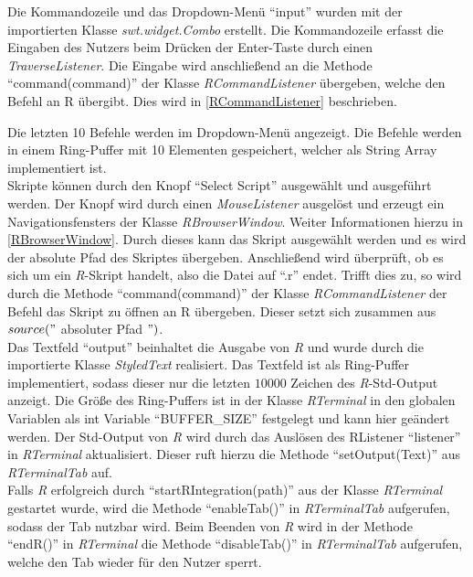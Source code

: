 \documentclass[a4paper, 12pt]{report} %
\begin{document}
Die Kommandozeile und das Dropdown-Menü "`input"' wurden mit der importierten Klasse \textit{swt.widget.Combo} erstellt. Die Kommandozeile erfasst die Eingaben des Nutzers beim Drücken der Enter-Taste durch einen \textit{TraverseListener}. Die Eingabe wird anschließend an die Methode "`command(command)"' der Klasse  \textit{RCommandListener} übergeben, welche den Befehl an R übergibt. Dies wird in \ref{RCommandListener} beschrieben.

Die letzten 10 Befehle werden im Dropdown-Menü angezeigt. Die Befehle werden in einem Ring-Puffer mit 10 Elementen gespeichert, welcher als String Array implementiert ist.\\

Skripte können durch den Knopf "`Select Script"' ausgewählt und ausgeführt werden. Der Knopf wird durch einen \textit{MouseListener} ausgelöst und erzeugt ein Navigationsfensters der Klasse \textit{RBrowserWindow}. Weiter Informationen hierzu in \ref{RBrowserWindow}. Durch dieses kann das Skript ausgewählt werden und es wird der absolute Pfad des Skriptes übergeben. Anschließend wird überprüft, ob es sich um ein \textit{R}-Skript handelt, also die Datei auf "`.r"' endet. Trifft dies zu, so wird durch die Methode "`command(command)"' der Klasse  \textit{RCommandListener} der Befehl das Skript zu öffnen an R übergeben. Dieser setzt sich zusammen aus $source("$  absoluter Pfad $")$. \\

Das Textfeld "`output"' beinhaltet die Ausgabe von \textit{R} und wurde durch die importierte Klasse \textit{StyledText} realisiert. Das Textfeld ist als Ring-Puffer implementiert, sodass dieser nur die letzten $10000$ Zeichen des \textit{R}-Std-Output anzeigt. Die Größe des Ring-Puffers ist in der Klasse \textit{RTerminal} in den globalen Variablen als int Variable "`BUFFER\_SIZE"' festgelegt und kann hier geändert werden.
Der Std-Output von \textit{R} wird durch das Auslösen des RListener "`listener"' in \textit{RTerminal} aktualisiert. Dieser ruft hierzu die Methode "`setOutput(Text)"' aus \textit{RTerminalTab} auf.\\

Falls \textit{R} erfolgreich durch "`startRIntegration(path)"' aus der Klasse \textit{RTerminal} gestartet wurde, wird die Methode "`enableTab()"' in \textit{RTerminalTab} aufgerufen, sodass der Tab nutzbar wird. Beim Beenden von \textit{R} wird in der Methode "`endR()"' in  \textit{RTerminal} die Methode "`disableTab()"' in \textit{RTerminalTab} aufgerufen, welche den Tab wieder für den Nutzer sperrt.
\end{document}
